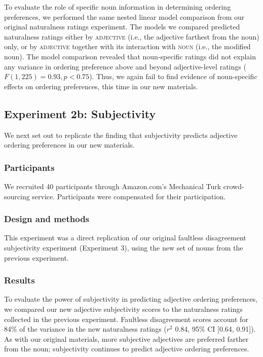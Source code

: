 \documentclass[12pt]{article}
\begin{document}
To evaluate the role of specific noun information in determining ordering preferences, we performed the same nested linear model comparison from our original naturalness ratings experiment. The models we compared predicted naturalness ratings either by \textsc{adjective} (i.e., the adjective farthest from the noun) only, or by \textsc{adjective} together with its interaction with \textsc{noun} (i.e., the modified noun).
The model comparison revealed that noun-specific ratings did not explain any variance in ordering preference above and beyond adjective-level ratings ($F(1,225) = 0.93, p < 0.75$).  Thus, we again fail to find evidence of noun-specific effects on ordering preferences, this time in our new materials.

\subsection{Experiment 2b: Subjectivity}

We next set out to replicate the finding that subjectivity predicts adjective ordering preferences in our new materials.

\subsubsection{Participants}

We recruited 40 participants through Amazon.com's Mechanical Turk crowd-sourcing service. Participants were compensated for their participation.

\subsubsection{Design and methods}

This experiment was a direct replication of our original faultless disagreement subjectivity experiment (Experiment 3), using the new set of nouns from the previous experiment.

\subsubsection{Results}

To evaluate the power of subjectivity in predicting adjective ordering preferences, we compared our new adjective subjectivity scores to the naturalness ratings collected in the previous experiment. 
Faultless disagreement scores account for  84\% of the variance in the new naturalness ratings ($r^2$ 0.84, 95\% CI [0.64,  0.91]). 
As with our original materials, more subjective adjectives are preferred farther from the noun; subjectivity continues to predict adjective ordering preferences.
\end{document}
